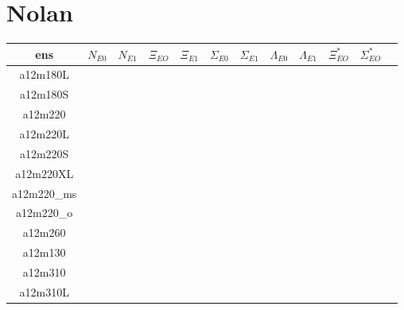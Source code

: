 \documentclass{article}
\begin{document}
\section*{Nolan}
\begin{table}[h!]
  \centering
 \setlength{\arrayrulewidth}{0.5mm}
\setlength{\tabcolsep}{13pt}
\renewcommand{\arraystretch}{2}
 \begin{tabular}{|| c |c | c | c | c | c | c | c | c | c | c | c  ||} 
 \hline
 ens & $N_{E0}$ & $N_{E1}$ & $\Xi_{EO}$ &  $\Xi_{E1}$ & $\Sigma_{E0}$ & $\Sigma_{E1}$ & $\Lambda_{E0}$ & $\Lambda_{E1}$ & $\Xi^*_{EO}$ &  $\Sigma^*_{EO}$ &\\ [0.8ex] 
 \hline\hline
 a12m180L 
 & {}   &   {} & {}   & {}   & {}  & {}   & {}  & {}  & {}  & {}  &  \\ 
 \hline
 a12m180S 
 & {}   &   {} & {}   & {}   & {}  & {}   & {}  & {}  & {}  & {}  &  \\
 \hline
 a12m220 
  & {}   &   {} & {}   & {}   & {}  & {}   & {}  & {}  & {}  & {}  &  \\
 \hline
 a12m220L 
  & {}   &   {} & {}   & {}   & {}  & {}   & {}  & {}  & {}  & {}  &  \\
 \hline
 a12m220S
 & {}   &   {} & {}   & {}   & {}  & {}   & {}  & {}  & {}  & {}  &  \\
 \hline
 a12m220XL
  & {}   &   {} & {}   & {}   & {}  & {}   & {}  & {}  & {}  & {}  &  \\
 \hline
 a12m220_{ms}
  & {}   &   {} & {}   & {}   & {}  & {}   & {}  & {}  & {}  & {}  &  \\
 \hline
 a12m220_o 
  & {}   &   {} & {}   & {}   & {}  & {}   & {}  & {}  & {}  & {}  &  \\
 \hline
 a12m260 
  & {}   &   {} & {}   & {}   & {}  & {}   & {}  & {}  & {}  & {}  &  \\
 \hline
 a12m130 
  & {}   &   {} & {}   & {}   & {}  & {}   & {}  & {}  & {}  & {}  &  \\
 \hline
 a12m310
  & {}   &   {} & {}   & {}   & {}  & {}   & {}  & {}  & {}  & {}  &  \\
 \hline

 a12m310L
  & {}   &   {} & {}   & {}   & {}  & {}   & {}  & {}  & {}  & {}  &  \\
 \hline
 
 \end{tabular}
\end{table}

 \newpage
 
\end{document}
